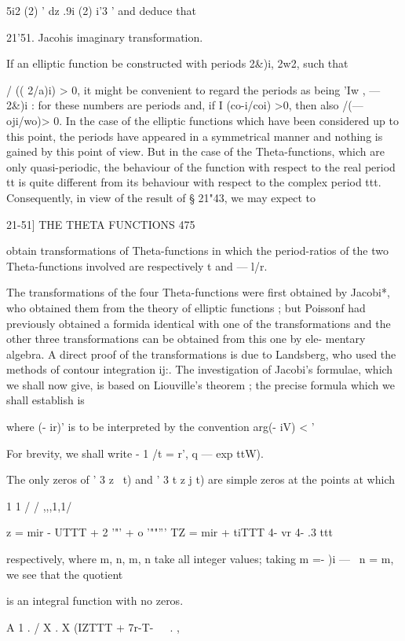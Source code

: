 5i2 (2) ' dz .9i (2) i'3 ' and deduce that

21'51. Jacohis imaginary transformation.

If an elliptic function be constructed with periods 2\&)i, 2w2, such
that

/ (( 2/a)i) > 0, it might be convenient to regard the periods as being
'Iw , — 2\&)i : for these numbers are periods and, if I (co-i/coi) >0,
then also /(— oji/wo)> 0. In the case of the elliptic functions which
have been considered up to this point, the periods have appeared in a
symmetrical manner and nothing is gained by this point of view. But in
the case of the Theta-functions, which are only quasi-periodic, the
behaviour of the function with respect to the real period tt is quite
different from its behaviour with respect to the complex period ttt.
Consequently, in view of the result of § 21"43, we may expect to

21-51] THE THETA FUNCTIONS 475

obtain transformations of Theta-functions in which the period-ratios
of the two Theta-functions involved are respectively t and — l/r.

The transformations of the four Theta-functions were first obtained by
Jacobi*, who obtained them from the theory of elliptic functions ; but
Poissonf had previously obtained a formida identical with one of the
transformations and the other three transformations can be obtained
from this one by ele- mentary algebra. A direct proof of the
transformations is due to Landsberg, who used the methods of contour
integration ij:. The investigation of Jacobi's formulae, which we
shall now give, is based on Liouville's theorem ; the precise formula
which we shall establish is

where (- ir)' is to be interpreted by the convention arg(- iV) < '

For brevity, we shall write - 1 /t = r', q — exp ttW).

The only zeros of ' 3 z \ t) and ' 3 t z j t) are simple zeros at the
points at which

1 1 / / ,,,1,1/

z = mir - UTTT + 2 '"' + o '""''' TZ = mir + tiTTT 4- vr 4- .3 ttt

respectively, where m, n, m, n take all integer values; taking m =- )i
— \, n = m, we see that the quotient

is an integral function with no zeros.

A 1 . / X . X (IZTTT + 7r-T-\ \ \ . ,

